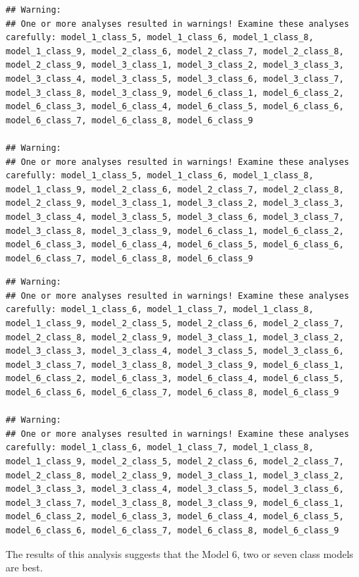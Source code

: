 \documentclass[man]{apa6}
\begin{document}
\begin{verbatim}
## Warning: 
## One or more analyses resulted in warnings! Examine these analyses carefully: model_1_class_5, model_1_class_6, model_1_class_8, model_1_class_9, model_2_class_6, model_2_class_7, model_2_class_8, model_2_class_9, model_3_class_1, model_3_class_2, model_3_class_3, model_3_class_4, model_3_class_5, model_3_class_6, model_3_class_7, model_3_class_8, model_3_class_9, model_6_class_1, model_6_class_2, model_6_class_3, model_6_class_4, model_6_class_5, model_6_class_6, model_6_class_7, model_6_class_8, model_6_class_9

## Warning: 
## One or more analyses resulted in warnings! Examine these analyses carefully: model_1_class_5, model_1_class_6, model_1_class_8, model_1_class_9, model_2_class_6, model_2_class_7, model_2_class_8, model_2_class_9, model_3_class_1, model_3_class_2, model_3_class_3, model_3_class_4, model_3_class_5, model_3_class_6, model_3_class_7, model_3_class_8, model_3_class_9, model_6_class_1, model_6_class_2, model_6_class_3, model_6_class_4, model_6_class_5, model_6_class_6, model_6_class_7, model_6_class_8, model_6_class_9
\end{verbatim}

\begin{verbatim}
## Warning: 
## One or more analyses resulted in warnings! Examine these analyses carefully: model_1_class_6, model_1_class_7, model_1_class_8, model_1_class_9, model_2_class_5, model_2_class_6, model_2_class_7, model_2_class_8, model_2_class_9, model_3_class_1, model_3_class_2, model_3_class_3, model_3_class_4, model_3_class_5, model_3_class_6, model_3_class_7, model_3_class_8, model_3_class_9, model_6_class_1, model_6_class_2, model_6_class_3, model_6_class_4, model_6_class_5, model_6_class_6, model_6_class_7, model_6_class_8, model_6_class_9

## Warning: 
## One or more analyses resulted in warnings! Examine these analyses carefully: model_1_class_6, model_1_class_7, model_1_class_8, model_1_class_9, model_2_class_5, model_2_class_6, model_2_class_7, model_2_class_8, model_2_class_9, model_3_class_1, model_3_class_2, model_3_class_3, model_3_class_4, model_3_class_5, model_3_class_6, model_3_class_7, model_3_class_8, model_3_class_9, model_6_class_1, model_6_class_2, model_6_class_3, model_6_class_4, model_6_class_5, model_6_class_6, model_6_class_7, model_6_class_8, model_6_class_9
\end{verbatim}

The results of this analysis suggests that the Model 6, two or seven class models are best.
\end{document}
